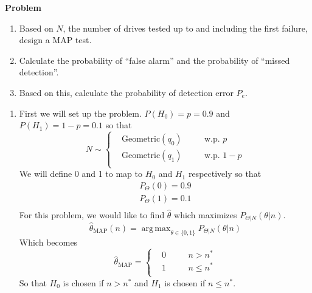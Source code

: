 \documentclass[12pt]{article}
\newenvironment{Ex}{\textbf{Problem}\vspace{.75em}\\}{}
\DeclareMathOperator*{\argmax}{arg\,max}
\begin{document}
\begin{enumerate}
\begin{Ex}
    \begin{enumerate}
    \item Based on $N$, the number of drives tested up to and
      including the first failure, design a MAP test.
    \item Calculate the probability of ``false alarm'' and the
      probability of ``missed detection''.
    \item Based on this, calculate the probability of detection error
      $P_e$.
    \end{enumerate}
    \begin{solution} \hfill
      \begin{enumerate}
      \item First we will set up the problem. $P(H_0)=p=0.9$ and
        $P(H_1)=1-p=0.1$ so that
        \begin{equation}
          \label{eq:1a-n-dist}
          N\sim\left\{
            \begin{aligned}
              & \text{Geometric}(q_0) && \quad\text{w.p. } p \\
              & \text{Geometric}(q_1) && \quad\text{w.p. } 1-p \\
            \end{aligned} \right.
        \end{equation}
        We will define 0 and 1 to map to $H_0$ and $H_1$
        respectively so that
        \begin{equation}
          \label{eq:1a-h-mapping}
          \begin{aligned}
            P_\Theta(0) = 0.9 \\
            P_\Theta(1) = 0.1 \\
          \end{aligned}
        \end{equation}
        For this problem, we would like to find $\hat{\theta}$ which
        maximizes $P_{\Theta|N}(\theta|n)$.
        \begin{equation}
          \label{eq:1a-theta-hat}
          \hat{\theta}_{\text{MAP}}(n) = \argmax_{\theta \in \{0,1\}}
          P_{\Theta|N}(\theta|n)
        \end{equation}
        Which becomes
        \begin{equation}
          \label{eq:1a-theta-hat-expanded}
          \hat{\theta}_{\text{MAP}} = \left\{
            \begin{aligned}
              & 0 &&\quad n>n^* \\
              & 1 &&\quad n\le n^* \\
            \end{aligned} \right.
        \end{equation}
        So that $H_0$ is chosen if $n>n^*$ and $H_1$ is chosen if
        $n\le n^*$.


\end{enumerate}
\end{solution}
\end{Ex}
\end{enumerate}
\end{document}
